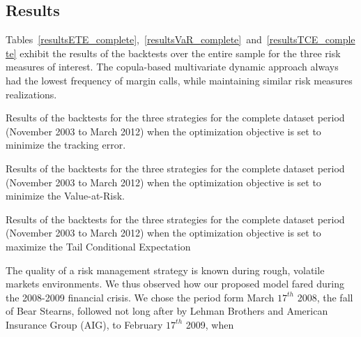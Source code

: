 \subsection{Results}

Tables~\ref{resultsETE_complete},~\ref{resultsVaR_complete}~and~\ref{resultsTCE_complete}
exhibit the results of the backtests
over the entire sample for the three risk measures of interest.
The copula-based multivariate dynamic approach always had the
lowest frequency of margin
calls, while maintaining similar risk measures realizations.
\begin{table}[p]
    \begin{adjustwidth}{-1in}{-1in}
    \centering
    
    \end{adjustwidth}
    \caption[Results of the backtests - Minimized ETE - 2003-2012]{Results of the backtests for the three strategies for the complete dataset period (November 2003 to March 2012) when the optimization objective is set to minimize the tracking error.}
    \label{resultsETE_complete}
\end{table}
\begin{table}[p]
    \begin{adjustwidth}{-1in}{-1in}
    \centering
    
    \end{adjustwidth}
    \caption[Results of the backtests - Minimized VaR - 2003-2012]{Results of the backtests for the three strategies for the complete dataset period (November 2003 to March 2012) when the optimization objective is set to minimize the Value-at-Risk.}
    \label{resultsVaR_complete}
\end{table}
\begin{table}[p]
    \begin{adjustwidth}{-1in}{-1in}
    \centering
    
    \end{adjustwidth}
    \caption[Results of the backtests - Minimized TCE - 2003-2012]{Results of the backtests for the three strategies for the complete dataset period (November 2003 to March 2012) when the optimization objective is set to maximize the Tail Conditional Expectation}
    \label{resultsTCE_complete}
\end{table}
The quality of a risk management strategy is known during rough,
volatile markets environments. We thus observed how our proposed
model fared during the 2008-2009 financial crisis. We chose the period
form March $17^{th}$ 2008, the fall of Bear Stearns, followed not long
after by Lehman Brothers and American Insurance Group (AIG), to February $17^{th}$ 2009, when
